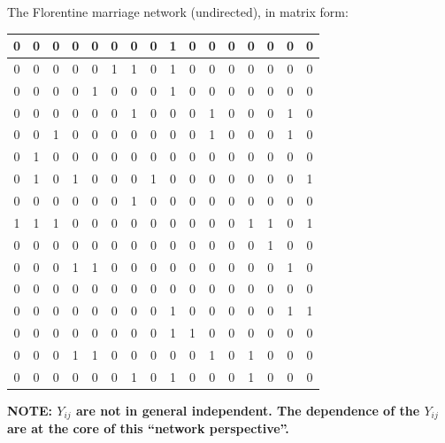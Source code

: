 \documentclass[slidestop,compress, 10pt]{beamer}
\begin{document}
{The Florentine marriage network (undirected), in matrix form:
{\tiny
\begin{table}[htdp]
\begin{center}\begin{tabular}{|c|c|c|c|c|c|c|c|c|c|c|c|c|c|c|c|}
\hline 
0 & 0 & 0 & 0 &  0 &  0 &0 &0 & 1&0 &      0 &      0 &      0 & 0 &      0 &      0 \\ \hline
0 & 0 &  0 & 0 &     0 &1&     1&     0 &     1&      0 &      0 &      0 & 0 &0 &0 &0 \\  \hline
0 & 0 & 0 &0 & 1&     0 &     0 &     0 &     1&      0 &      0 &      0 & 0 &0 &0 &0 \\  \hline
0 & 0 & 0 &0 & 0 &     0 &     1&     0 &     0 &      0 &      1&      0 & 0 & 0 &1&0 \\  \hline
0 & 0 & 1& 0 & 0 &     0 &     0 &     0 &     0 &      0 &      1&      0 & 0 & 0 &1&0 \\  \hline
0 & 1&  0 &0 & 0 &     0 &     0 &     0 &     0 &      0 &      0 &      0 & 0 & 0 &0 &0 \\   \hline
0 & 1&0 & 1&0 & 0 &     0 &     1&     0 &      0 &      0 &      0 &  0 &      0 & 0 &1 \\  \hline
0 & 0 &0 & 0 & 0 &     0 &     1&     0 &     0 &      0 &      0 &      0 & 0 & 0 &0 &0 \\  \hline
1& 1& 1&0 &0 & 0 &     0 &     0 &     0 &      0 &      0 &      0 &  1& 1&0 &      1\\  \hline
0 & 0 &0 &0 & 0 &     0 &     0 &     0 &     0 &      0 &      0 & 0 & 0 &1&      0 &      0 \\  \hline
0 &0 &0 &1&1&  0 &     0 &     0 &     0 &      0 &      0 &0 &    0 &      0 &      1&      0 \\  \hline
0 & 0 & 0 &0 &0 &0 & 0 &     0 &     0 &      0 &      0 &      0 & 0 &      0 &      0 &      0 \\  \hline
0 & 0 &0 & 0 &0 &0 &0 & 0 &     1&      0 &      0 &      0 & 0 &      0 &      1&      1\\  \hline
0 & 0 & 0 & 0 & 0 & 0 & 0 &     0 &     1&      1&      0 &      0 & 0 &      0 &      0 &      0 \\   \hline
0 & 0 &0 & 1& 1& 0 & 0 &     0 &     0 &      0 &      1&      0 &   1&      0 &      0 &      0 \\  \hline
0 & 0 &0 & 0 & 0 & 0 &     1&     0 &     1&      0 &      0 &      0 & 1&      0 &      0 &      0\\ 
\hline \end{tabular} 
\end{center}
\label{defaulttable}
\end{table}
}
\textbf{NOTE: $Y_{ij}$ are not in general independent.  The dependence of the $Y_{ij}$ are at the core of this ``network perspective''.}
}
\end{document}
